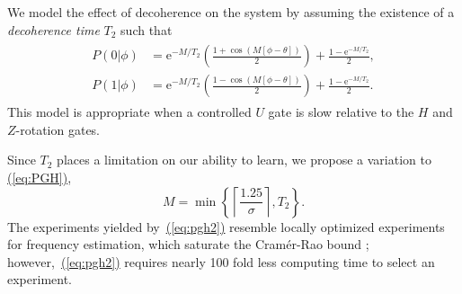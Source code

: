 \documentclass[aps,prl,amsmath,twocolumn,amssymb,superscriptaddress]{revtex4-1}
\newcommand{\eq}[1]{\hyperref[eq:#1]{(\ref*{eq:#1})}}
\newcommand{\ee}{\mathrm{e}}
\begin{document}
We model the effect of decoherence on the system by assuming the existence of a \emph{decoherence time} $T_2$ such that
\begin{gather}
    \label{eq:likedecohere}
    \begin{aligned}
        P(0|\phi) & = \ee^{-M/T_2}\left(\frac{1+\cos(M[\phi -\theta])}{2}\right)+\frac{1-\ee^{-M/T_2}}{2},\\
        P(1|\phi) & = \ee^{-M/T_2}\left(\frac{1-\cos(M[\phi -\theta])}{2}\right)+\frac{1-\ee^{-M/T_2}}{2}.
    \end{aligned}
\end{gather}
This model is appropriate when a controlled $U$ gate is slow relative to the $H$ and $Z$-rotation gates.  %
 

Since $T_2$ places a limitation on our ability to learn, we propose a variation to \eq{PGH},
\begin{equation}
    \label{eq:pgh2}
    M = \min\left\{\left\lceil\frac{1.25}{\sigma}\right\rceil, T_2 \right\}.
\end{equation}
The experiments yielded by~\eq{pgh2} resemble locally optimized experiments for frequency estimation, which saturate the Cram\'er-Rao bound \cite{ferrie_how_2013}; however,~\eq{pgh2} requires nearly 100 fold less computing time to select an experiment.
\end{document}
